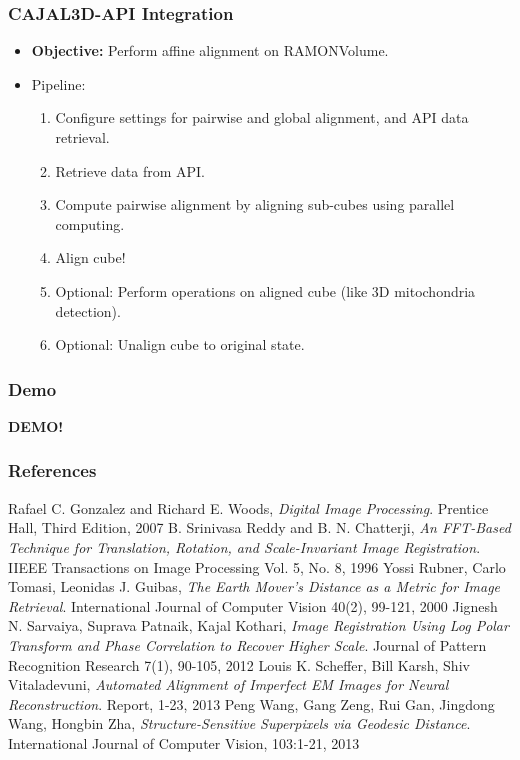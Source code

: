 \documentclass{beamer}
\begin{document}
\begin{frame}
\frametitle{CAJAL3D-API Integration}
\begin{itemize}
\item \textbf{Objective:} Perform affine alignment on RAMONVolume.
\item Pipeline:
\begin{enumerate}
\item Configure settings for pairwise and global alignment, and API data retrieval. 
\item Retrieve data from API. 
\item Compute pairwise alignment by aligning sub-cubes using parallel computing. 
\item Align cube!
\item Optional: Perform operations on aligned cube (like 3D mitochondria detection).
\item Optional: Unalign cube to original state. 
\end{enumerate}
\end{itemize}
\end{frame}

\begin{frame}
\frametitle{Demo}
\textbf{DEMO!}
\end{frame}

\begin{frame}
\frametitle{References}
\begin{thebibliography}{9}
	Rafael C. Gonzalez and Richard E. Woods,
	\emph{Digital Image Processing}.
	Prentice Hall, Third Edition, 2007
	B. Srinivasa Reddy and B. N. Chatterji,
	\emph{An FFT-Based Technique for Translation, Rotation, and Scale-Invariant Image Registration}.
	IIEEE Transactions on Image Processing Vol. 5, No. 8, 1996
	Yossi Rubner, Carlo Tomasi, Leonidas J. Guibas,
	\emph{The Earth Mover's Distance as a Metric for Image Retrieval}.
	International Journal of Computer Vision 40(2), 99-121, 2000
	Jignesh N. Sarvaiya, Suprava Patnaik, Kajal Kothari,
	\emph{Image Registration Using Log Polar Transform and Phase Correlation to Recover Higher Scale}.
	Journal of Pattern Recognition Research 7(1), 90-105, 2012
	Louis K. Scheffer, Bill Karsh, Shiv Vitaladevuni,
	\emph{Automated Alignment of Imperfect EM Images for Neural Reconstruction}.
	Report, 1-23, 2013
	Peng Wang, Gang Zeng, Rui Gan, Jingdong Wang, Hongbin Zha,
	\emph{Structure-Sensitive Superpixels via Geodesic Distance}.
	International Journal of Computer Vision, 103:1-21, 2013
\end{thebibliography} 
\end{frame}
\end{document}
